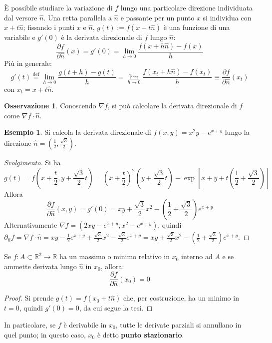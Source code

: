 \documentclass[11pt, a4paper]{scrartcl}
\newenvironment{svolgimento}{\renewcommand\qedsymbol{$\blacksquare$}\begin{proof}[Svolgimento]}{\end{proof}}
\theoremstyle{definition}
\newtheorem{esempio}{Esempio}
\numberwithin{esempio}{section}
\theoremstyle{definition}
\newtheorem{obs}{Osservazione}
\numberwithin{obs}{section}
\numberwithin{nota}{section}
\numberwithin{equation}{subsection}
\begin{document}
\`E possibile studiare la variazione di $f$ lungo una particolare direzione individuata dal versore $\hat{n}$. Una retta parallela a $\hat{n}$ e passante per un punto $x$ si individua con $x+t \hat{n}$; fissando i punti $x$ e $\hat{n}$, $g(t) := f(x+t\hat{n})$ \`e una funzione di una variabile e $g'(0)$ \`e la derivata direzionale di $f$ lungo $\hat{n}$:
\begin{equation}
	\frac{\partial f}{\partial \hat{n}} (x) = g'(0) = \lim_{h \to 0} \frac{f(x+h\hat{n}) - f(x)}{h}
\end{equation}
Pi\`u in generale:
\begin{equation}
	g'(t) \overset{\text{def}}{=} \lim_{h \to 0} \frac{g(t+h) - g(t)}{h} = \lim_{h \to 0} \frac{f(x_t+ h \hat{n}) - f(x_t)}{h} \equiv \frac{\partial f}{\partial \hat{n}} (x_t)
\end{equation}
con $x_t = x+t \hat{n}$. 
\begin{obs}
	Conoscendo $\nabla f$, si pu\`o calcolare la derivata direzionale di $f$ come $\nabla f \cdot \hat{n}$.
\end{obs}
\begin{esempio}
	Si calcola la derivata direzionale di $f(x,y) = x^2 y - e^{x+y} $ lungo la direzione $\hat{n} = \left(\frac{1}{2}, \frac{\sqrt{3} }{2}\right) $.
	\begin{svolgimento}
		Si ha 
		\[
		g(t) = f\left(x + \frac{t}{2}, y + \frac{\sqrt{3} }{2}t\right) = \left(x + \frac{t}{2}\right) ^2 \left(y + \frac{\sqrt{3} }{2}t\right) - \exp \left[ x + y + t\left(\frac{1}{2} + \frac{\sqrt{3} }{2}\right)  \right] 
		\] 
		Allora 
		\[
		\frac{\partial f}{\partial \hat{n}} (x,y) = g'(0) = xy + \frac{\sqrt{3} }{2}x^2 - \left(\frac{1}{2}+ \frac{\sqrt{3} }{2} \right) e^{x+y} 
		\] 
		Alternativamente $\nabla f = \left(2xy - e^{x+y} , x^2 - e^{x+y} \right) $, quindi $\partial _{\hat{n}} f = \nabla f \cdot \hat{n} =xy - \frac{1}{2} e^{x+y} +\frac{\sqrt{3} }{2} x^2 - \frac{\sqrt{3} }{2}e^{x+y} = xy + \frac{\sqrt{3} }{2}x^2 - \left(\frac{1}{2}+\frac{\sqrt{3} }{2}\right) e^{x+y}   $.
	\end{svolgimento}
\end{esempio}
\begin{teorema}
	{}{}
	Se $f:A\subset \mathbb{R}^2 \to  \mathbb{R}$ ha un massimo o minimo relativo in $x_0$ interno ad $A$ e se ammette derivata lungo $\hat{n}$ in $x_0$, allora:
	\begin{equation}
		\frac{\partial f}{\partial \hat{n}} (x_0)= 0 
	\end{equation}
	\begin{proof}
		Si prende $g(t) = f(x_0 + t \hat{n})$ che, per costruzione, ha un minimo in $t=0$, quindi $g'(0) = 0$, da cui segue la tesi.
	\end{proof}
\end{teorema}
\noindent In particolare, se $f$ \`e derivabile in $x_0$, tutte le derivate parziali si annullano in quel punto; in questo caso, $x_0$ \`e detto \textbf{punto stazionario}.
\end{document}
